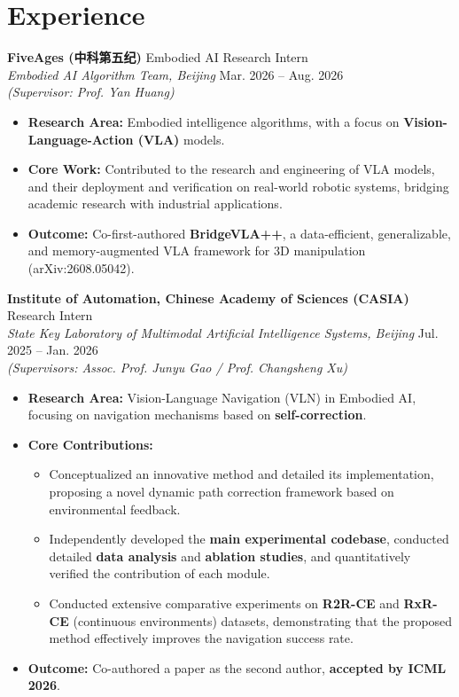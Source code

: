 \documentclass[11pt,a4paper]{article}
\begin{document}
\section{Experience}
\textbf{FiveAges (中科第五纪)} \hfill Embodied AI Research Intern \\
\textit{Embodied AI Algorithm Team, Beijing} \hfill Mar. 2026 -- Aug. 2026 \\
\textit{(Supervisor: Prof. Yan Huang)}
\begin{itemize}
    \item \textbf{Research Area:} Embodied intelligence algorithms, with a focus on \textbf{Vision-Language-Action (VLA)} models.
    \item \textbf{Core Work:} Contributed to the research and engineering of VLA models, and their deployment and verification on real-world robotic systems, bridging academic research with industrial applications.
    \item \textbf{Outcome:} Co-first-authored \textbf{BridgeVLA++}, a data-efficient, generalizable, and memory-augmented VLA framework for 3D manipulation (arXiv:2608.05042).
\end{itemize}

\vspace{0.4em}
\textbf{Institute of Automation, Chinese Academy of Sciences (CASIA)} \hfill Research Intern \\
\textit{State Key Laboratory of Multimodal Artificial Intelligence Systems, Beijing} \hfill Jul. 2025 -- Jan. 2026 \\
\textit{(Supervisors: Assoc. Prof. Junyu Gao / Prof. Changsheng Xu)}
\begin{itemize}
    \item \textbf{Research Area:} Vision-Language Navigation (VLN) in Embodied AI, focusing on navigation mechanisms based on \textbf{self-correction}.
    \item \textbf{Core Contributions:} 
    \begin{itemize}
        \item Conceptualized an innovative method and detailed its implementation, proposing a novel dynamic path correction framework based on environmental feedback.
        \item Independently developed the \textbf{main experimental codebase}, conducted detailed \textbf{data analysis} and \textbf{ablation studies}, and quantitatively verified the contribution of each module.
        \item Conducted extensive comparative experiments on \textbf{R2R-CE} and \textbf{RxR-CE} (continuous environments) datasets, demonstrating that the proposed method effectively improves the navigation success rate.
    \end{itemize}
    \item \textbf{Outcome:} Co-authored a paper as the second author, \textbf{accepted by ICML 2026}.
\end{itemize}
\end{document}

